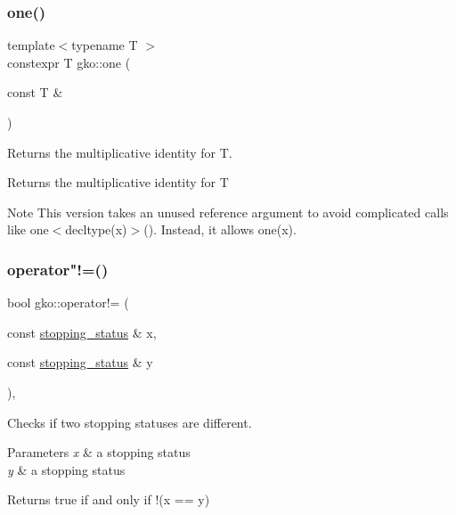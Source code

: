 \subsubsection{\texorpdfstring{one()}{one()}\hspace{0.1cm}{\footnotesize\ttfamily [2/2]}}
{\footnotesize\ttfamily template$<$typename T $>$ \\
constexpr T gko\+::one (\begin{DoxyParamCaption}\item[{const T \&}]{ }\end{DoxyParamCaption})\hspace{0.3cm}{\ttfamily [inline]}}



Returns the multiplicative identity for T. 

\begin{DoxyReturn}{Returns}
the multiplicative identity for T
\end{DoxyReturn}
\begin{DoxyNote}{Note}
This version takes an unused reference argument to avoid complicated calls like {\ttfamily one$<$decltype(x)$>$()}. Instead, it allows {\ttfamily one(x)}. 
\end{DoxyNote}
\mbox{\label{namespacegko_accf1dbf5054c76e154490d825b0f44ee}} 
\subsubsection{\texorpdfstring{operator"!=()}{operator!=()}\hspace{0.1cm}{\footnotesize\ttfamily [1/3]}}
{\footnotesize\ttfamily bool gko\+::operator!= (\begin{DoxyParamCaption}\item[{const \hyperlink{classgko_1_1stopping__status}{stopping\+\_\+status} \&}]{x,  }\item[{const \hyperlink{classgko_1_1stopping__status}{stopping\+\_\+status} \&}]{y }\end{DoxyParamCaption})\hspace{0.3cm}{\ttfamily [inline]}, {\ttfamily [noexcept]}}



Checks if two stopping statuses are different. 


\begin{DoxyParams}{Parameters}
{\em x} & a stopping status \\
\hline
{\em y} & a stopping status\\
\hline
\end{DoxyParams}
\begin{DoxyReturn}{Returns}
true if and only if {\ttfamily !(x == y)} 
\end{DoxyReturn}
\mbox{\label{namespacegko_a74c3716da36cbedc000aa24006b0bd46}} 
